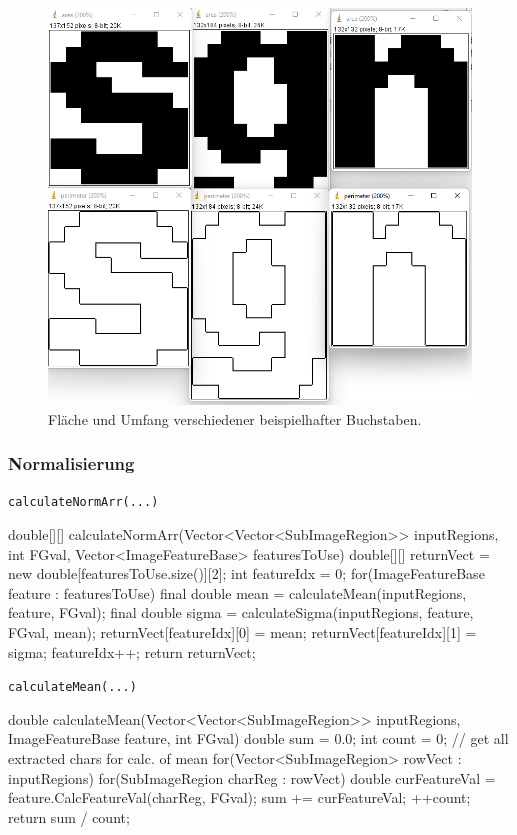\documentclass[german,notitlepage,smartquotes]{hgbreport}
\begin{document}
\begin{figure}[h]
\centering
\includegraphics[width=.85\textwidth]{area_perimeter}
\caption{Fläche und Umfang verschiedener beispielhafter Buchstaben.}
\label{fig:area_perimeter}
\end{figure}

\subsubsection{Normalisierung}

\begin{program}
\caption{\texttt{calculateNormArr(...)}}
\label{prog:calc-norm-arr}
\begin{JavaCode}
double[][] calculateNormArr(Vector<Vector<SubImageRegion>> inputRegions, int FGval, Vector<ImageFeatureBase> featuresToUse) {
	double[][] returnVect = new double[featuresToUse.size()][2];
	int featureIdx = 0;
	for(ImageFeatureBase feature : featuresToUse) {
		final double mean = calculateMean(inputRegions, feature, FGval);
		final double sigma = calculateSigma(inputRegions, feature, FGval, mean);
		returnVect[featureIdx][0] = mean;
		returnVect[featureIdx][1] = sigma;
		featureIdx++;
	}
	return returnVect;
}
\end{JavaCode}
\end{program}

\begin{program}
\caption{\texttt{calculateMean(...)}}
\label{prog:calc-mean}
\begin{JavaCode}
double calculateMean(Vector<Vector<SubImageRegion>> inputRegions, ImageFeatureBase feature, int FGval) {
	double sum = 0.0;
	int count = 0;
	// get all extracted chars for calc. of mean
	for(Vector<SubImageRegion> rowVect : inputRegions) {
		for(SubImageRegion charReg : rowVect) {
			double curFeatureVal = feature.CalcFeatureVal(charReg, FGval);
			sum += curFeatureVal;
			++count;
		}
	}
	return sum / count;
}
\end{JavaCode}
\end{program}
\end{document}
